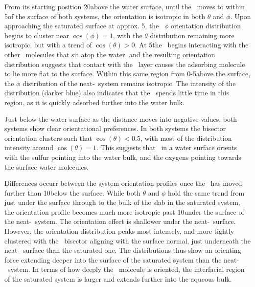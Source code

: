 	From its starting position 20\angs above the water surface, until the \suldiox~moves to within 5\angs of the surface of both systems, the orientation is isotropic in both $\theta$ and $\phi$. Upon approaching the saturated surface at approx. 5\angs, the \suldiox~$\phi$ orientation distribution begins to cluster near $\cos(\phi)=1$, with the $\theta$ distribution remaining more isotropic, but with a trend of $\cos(\theta)>0$. At 5\angs the \suldiox~begins interacting with the other \suldiox~molecules that sit atop the water, and the resulting orientation distribution suggests that contact with the \suldiox~layer causes the adsorbing molecule to lie more flat to the surface. Within this same region from 0-5\angs above the surface, the $\phi$ distribution of the neat-\wat~system remains isotropic. The intensity of the distribution (darker blue) also indicates that the \suldiox~spends little time in this region, as it is quickly adsorbed further into the water bulk.

	Just below the water surface as the distance moves into negative values, both systems show clear orientational preferences. In both systems the bisector orientation clusters such that $\cos(\theta)<0.5$, with most of the distribution intensity around $\cos(\theta)=1$. This suggests that \suldiox~in a water surface orients with the sulfur pointing into the water bulk, and the oxygens pointing towards the surface water molecules.

	Differences occurr between the system orientation profiles once the \suldiox~has moved further than 10\angs below the surface. While both $\theta$ and $\phi$ hold the same trend from just under the surface through to the bulk of the slab in the saturated system, the orientation profile becomes much more isotropic past 10\angs under the surface of the neat-\wat~system. The orientation effect is shallower under the neat-\wat~surface. However, the orientation distribution peaks most intensely, and more tightly clustered with the \suldiox~bisector aligning with the surface normal, just underneath the neat-\wat~surface than the saturated one. The distributions thus show an orienting force extending deeper into the surface of the saturated system than the neat-\wat~system. In terms of how deeply the \suldiox~molecule is oriented, the interfacial region of the saturated system is larger and extends further into the aqueous bulk.
